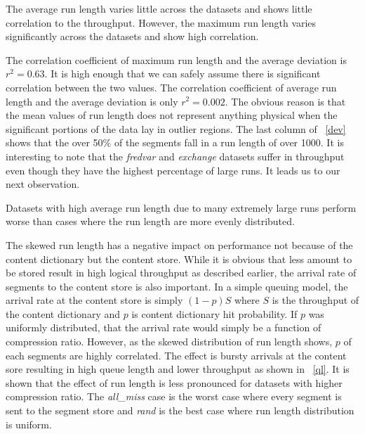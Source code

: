 \begin{observation}
The average run length varies little across the datasets and shows little correlation to the throughput. However, the maximum run length varies significantly across the datasets and show high correlation.
\end{observation}

The correlation coefficient of maximum run length and the average deviation is $r^2 = 0.63$. It is high enough that we can safely assume there is significant correlation between the two values. The correlation coefficient of average run length and the average deviation is only $r^2 = 0.002$. The obvious reason is that the mean values of run length does not represent anything physical when the significant portions of the data lay in outlier regions. The last column of \tablename~\ref{dev} shows that the over 50\% of the segments fall in a run length of over 1000. It is interesting to note that the \emph{fredvar} and \emph{exchange} datasets suffer in throughput even though they have the highest percentage of large runs. It leads us to our next observation.

\begin{observation}
Datasets with high average run length due to many extremely large runs perform worse than cases where the run length are more evenly distributed. 
\end{observation}

The skewed run length has a negative impact on performance not because of the content dictionary but the content store. While it is obvious that less amount to be stored result in high logical throughput as described earlier, the arrival rate of segments to the content store is also important. In a simple queuing model, the arrival rate at the content store is simply $(1-p)S$ where $S$ is the throughput of the content dictionary and $p$ is content dictionary hit probability. If $p$ was uniformly distributed, that the arrival rate would simply be a function of compression ratio. However, as the skewed distribution of run length shows, $p$ of each segments are highly correlated. The effect is bursty arrivals at the content sore resulting in high queue length and lower throughput as shown in \figurename~\ref{ql}. It is shown that the effect of run length is less pronounced for datasets with higher compression ratio. The \emph{all\_miss} case is the worst case where every segment is sent to the segment store and \emph{rand} is the best case where run length distribution is uniform.
 
